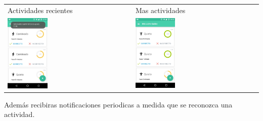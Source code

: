 {\begin{table}[h]
\begin{tabular}{ll}
\textsf{\relax 
Actividades recientes
} & \textsf{\relax 
Mas actividades
}\\
    {\includegraphics[width=0.33\textwidth]{anexos/graphics/activities_toast.jpg}}
 & 
    {\includegraphics[width=0.33\textwidth]{anexos/graphics/activities.jpg}}
\\
\end{tabular}
\end{table}


Además recibiras notificaciones periodicas a medida que se reconozca una actividad.

}
